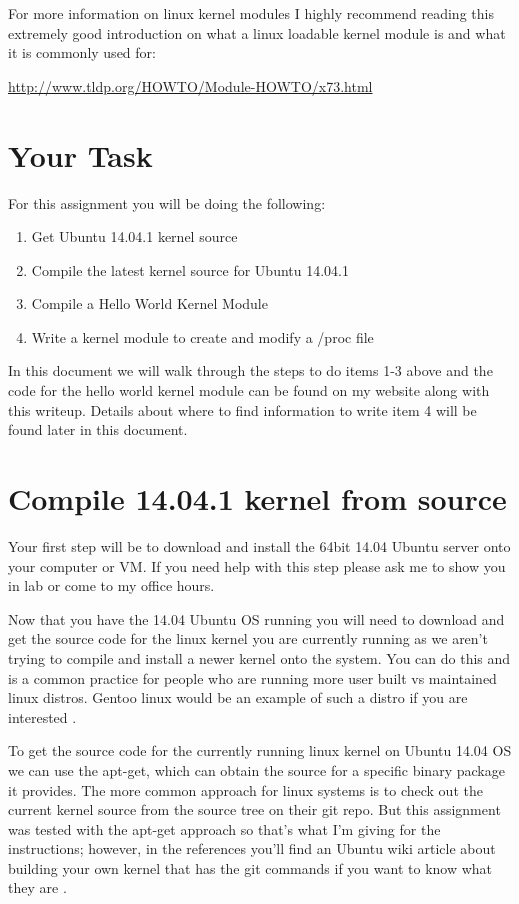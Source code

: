 \documentclass[11pt]{article}
\begin{document}
For more information on linux kernel modules I highly recommend reading this extremely good introduction on what a linux loadable kernel module is and what it is commonly used for:

{\url{http://www.tldp.org/HOWTO/Module-HOWTO/x73.html}}


\section*{Your Task}

For this assignment you will be doing the following:

\begin{enumerate}
\item{Get Ubuntu 14.04.1 kernel source}
\item{Compile the latest kernel source for Ubuntu 14.04.1}
\item{Compile a Hello World Kernel Module}
\item{Write a kernel module to create and modify a /proc file}
\end{enumerate}

In this document we will walk through the steps to do items 1-3 above and the code for the hello world kernel module can be found on my website along with this writeup. Details about where to find information to write item 4 will be found later in this document. 



\section*{Compile 14.04.1 kernel from source}

Your first step will be to download and install the 64bit 14.04 Ubuntu server \cite{ubuntuserver} onto your computer or VM. If you need help with this step please ask me to show you in lab or come to my office hours. 

Now that you have the 14.04 Ubuntu OS running you will need to download and get the source code for the linux kernel you are currently running as we aren't trying to compile and install a newer kernel onto the system. You can do this and is a common practice for people who are running more user built vs maintained linux distros. Gentoo linux would be an example of such a distro if you are interested \cite{gentoo}. 

To get the source code for the currently running linux kernel on Ubuntu 14.04 OS we can use the apt-get, which can obtain the source for a specific binary package it provides. The more common approach for linux systems is to check out the current kernel source from the source tree on their git repo. But this assignment was tested with the apt-get approach so that's what I'm giving for the instructions; however, in the references you'll find an Ubuntu wiki article about building your own kernel that has the git commands if you want to know what they are \cite{ubuntukernel}.
\end{document}
